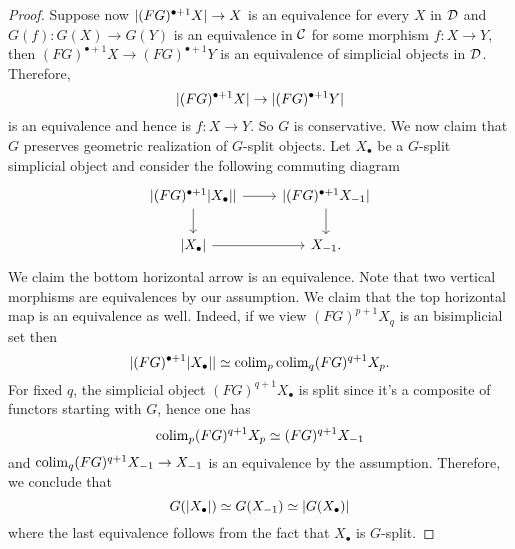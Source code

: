 \begin{proof}
	Suppose now $\lvert(FG)^{\bullet+1}X\rvert \to X$ is an equivalence for every $X$ in ${\mathcal{D}}$ and $G(f): G(X) \to G(Y)$ is an equivalence in ${\mathcal{C}}$ for some morphism $f:X \to Y$, then $(FG)^{\bullet+1} X \to (FG)^{\bullet+1}Y$ is an equivalence of simplicial objects in ${\mathcal{D}}$. Therefore, 
	$$
	\lvert(FG)^{\bullet+1} X\rvert \to \lvert(FG)^{\bullet+1} Y\rvert
	$$
	is an equivalence and hence is $f: X\to Y$. So $G$ is conservative.
	We now claim that $G$ preserves geometric realization of $G$-split objects.
	Let $X_{\bullet}$ be a $G$-split simplicial object and consider the following commuting diagram
	\[
	\begin{tikzcd}
		\abs{(FG)^{\bullet+1} \abs{X_{\bullet}}} \ar[r] \ar[d]& \abs{(FG)^{\bullet+1} X_{-1} \ar[d]}     \\
		\abs{X_{\bullet}} \ar[r] & X_{-1}  .
	\end{tikzcd}
	\]
	We claim the bottom horizontal arrow is an equivalence.
	Note that two vertical morphisms are equivalences by our assumption. We claim that the top horizontal map is an equivalence as well. Indeed, if we view $(FG)^{p+1} X_{q}$ is an bisimplicial set then 
	$$
	\lvert(FG)^{\bullet+1} \lvert X_{\bullet}\rvert\rvert 
	\simeq 
	\operatorname{colim}_{p} \operatorname{colim}_q (FG)^{q+1}X_{p} .
	$$
	For fixed $q$, the simplicial object $(FG)^{q+1}X_{\bullet}$ is split since it's a composite of functors starting with $G$, hence one has 
	$$
	\operatorname{colim}_{p}(FG)^{q+1}X_{p}\simeq (FG)^{q+1}X_{-1}
	$$
	and $\operatorname{colim}_{q} (FG)^{q+1} X_{-1} \to X_{-1}$  is an equivalence by the assumption.
	Therefore, we conclude that 
	$$
	G(\lvert X_{\bullet}\rvert) \simeq G(X_{-1}) \simeq \lvert G(X_{\bullet})\rvert
	$$
	where the last equivalence follows from the fact that $X_{\bullet}$ is $G$-split.
\end{proof}

